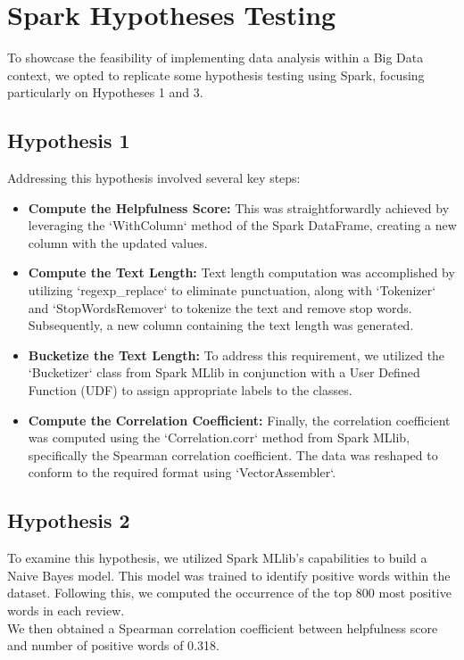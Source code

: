 \section{Spark Hypotheses Testing}
To showcase the feasibility of implementing data analysis within a Big Data context, we opted to replicate some hypothesis testing using
Spark, focusing particularly on Hypotheses 1 and 3.

\subsection*{Hypothesis 1}
Addressing this hypothesis involved several key steps:

\begin{itemize}[leftmargin=*, noitemsep]
      \item \textbf{Compute the Helpfulness Score:}
            This was straightforwardly achieved by leveraging the `WithColumn` method of the Spark DataFrame, creating a new column with the updated values.

      \item \textbf{Compute the Text Length:}
            Text length computation was accomplished by utilizing `regexp\_replace` to eliminate punctuation, along with `Tokenizer` and `StopWordsRemover`
            to tokenize the text and remove stop words. Subsequently, a new column containing the text length was generated.

      \item \textbf{Bucketize the Text Length:}
            To address this requirement, we utilized the `Bucketizer` class from Spark MLlib in conjunction with a User Defined Function (UDF) to
            assign appropriate labels to the classes.

      \item \textbf{Compute the Correlation Coefficient:}
            Finally, the correlation coefficient was computed using the `Correlation.corr` method from Spark MLlib, specifically the Spearman correlation
            coefficient. The data was reshaped to conform to the required format using `VectorAssembler`.

\end{itemize}

\subsection*{Hypothesis 2}
To examine this hypothesis, we utilized Spark MLlib's capabilities to build a Naive Bayes model.
This model was trained to identify positive words within the dataset.
Following this, we computed the occurrence of the top 800 most positive words in each review.\\
We then obtained a Spearman correlation coefficient between helpfulness score and number of positive words of 0.318.
